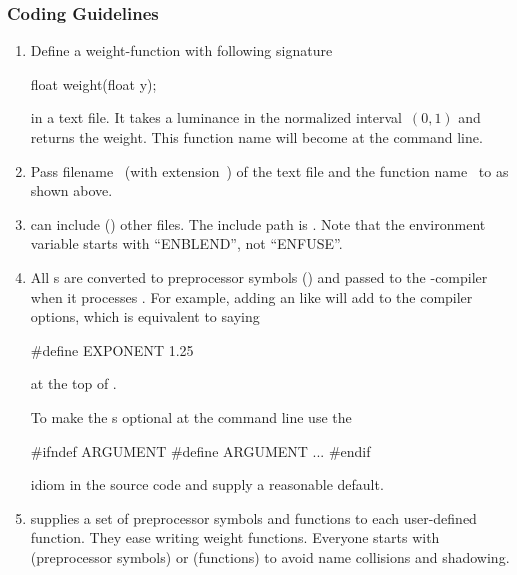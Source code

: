 \subsubsection[\acronym{OpenCL} Coding Guidelines]{\label{sec:opencl-coding-guidelines}%
   Coding Guidelines}

\begin{enumerate}
\item
  Define a weight-function with following signature
  \begin{cxxlisting}
float weight(float y);
  \end{cxxlisting}
  in a text file.  It takes a luminance in the normalized interval~$(0, 1)$ and returns the
  weight.  This function name will become  at the \App{} command line.

\item
  Pass filename~ (with extension~) of the text file and the
  function name~ to \App{} as shown above.

\item
   can include () other files.  The include path
  is .  Note that the environment variable starts with
  ``ENBLEND'', not ``ENFUSE''.

\item
  All s are converted to preprocessor symbols () and
  passed to the -compiler when it processes .  For
  example, adding an  like  will add
   to the compiler options, which is equivalent to saying
  \begin{cxxlisting}
#define EXPONENT 1.25
  \end{cxxlisting}
  at the top of .

  To make the s optional at the \app{} command line use the
  \begin{cxxlisting}
#ifndef ARGUMENT
#define ARGUMENT ...
#endif
  \end{cxxlisting}
  idiom in the source code and supply a reasonable default.

\item
  \App{} supplies a set of preprocessor symbols and functions to each user-defined function.
  They ease writing weight functions.  Everyone starts with  (preprocessor
  symbols) or  (functions) to avoid name collisions and shadowing.


\end{enumerate}
